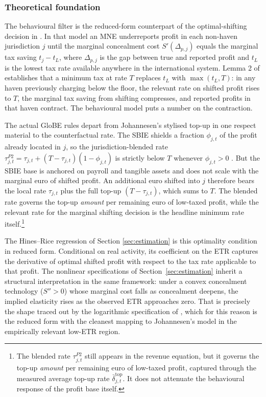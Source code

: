 \documentclass[11pt,a4paper]{article}
\begin{document}
\subsubsection{Theoretical foundation}\label{sec:behavioural_theory}

The behavioural filter is the reduced-form counterpart of the optimal-shifting decision in \citet{johannesen2022}. In that model an MNE underreports profit in each non-haven jurisdiction $j$ until the marginal concealment cost $S'(\Delta_{p,j})$ equals the marginal tax saving $t_j - t_L$, where $\Delta_{p,j}$ is the gap between true and reported profit and $t_L$ is the lowest tax rate available anywhere in the international system. Lemma 2 of \citet{johannesen2022} establishes that a minimum tax at rate $T$ replaces $t_L$ with $\max(t_L, T)$: in any haven previously charging below the floor, the relevant rate on shifted profit rises to $T$, the marginal tax saving from shifting compresses, and reported profits in that haven contract. The behavioural model puts a number on the contraction.

The actual GloBE rules depart from Johannesen's stylised top-up in one respect material to the counterfactual rate. The SBIE shields a fraction $\phi_{j,t}$ of the profit already located in $j$, so the jurisdiction-blended rate $\tau_{j,t}^{P2} = \tau_{j,t} + (T - \tau_{j,t})(1-\phi_{j,t})$ is strictly below $T$ whenever $\phi_{j,t}>0$ \citep{schjelderup2024}. But the SBIE base is anchored on payroll and tangible assets and does not scale with the marginal euro of shifted profit. An additional euro shifted into $j$ therefore bears the local rate $\tau_{j,t}$ plus the full top-up $(T-\tau_{j,t})$, which sums to $T$. The blended rate governs the top-up \emph{amount} per remaining euro of low-taxed profit, while the relevant rate for the marginal shifting decision is the headline minimum rate itself.\footnote{The blended rate $\tau_{j,t}^{P2}$ still appears in the revenue equation, but it governs the top-up \emph{amount} per remaining euro of low-taxed profit, captured through the measured average top-up rate $\bar{\delta}_{j,t}^{\text{top}}$. It does not attenuate the behavioural response of the profit base itself.}

The Hines--Rice regression of Section \ref{sec:estimation} is this optimality condition in reduced form. Conditional on real activity, its coefficient on the ETR captures the derivative of optimal shifted profit with respect to the tax rate applicable to that profit. The nonlinear specifications of Section~\ref{sec:estimation} inherit a structural interpretation in the same framework: under a convex concealment technology ($S''>0$) whose marginal cost falls as concealment deepens, the implied elasticity rises as the observed ETR approaches zero. That is precisely the shape traced out by the logarithmic specification of \citet{garcia-bernardo2024}, which for this reason is the reduced form with the cleanest mapping to Johannesen's model in the empirically relevant low-ETR region.
\end{document}

